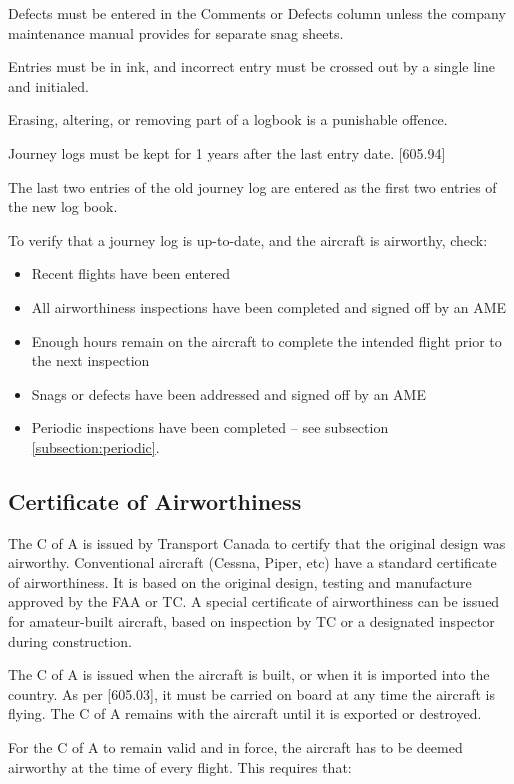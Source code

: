 \documentclass[12pt,letterpaper]{article}
\begin{document}
    Defects must be entered in the Comments or Defects column unless the company maintenance manual provides for separate snag sheets.
    
    Entries must be in ink, and incorrect entry must be crossed out by a single line and initialed.
    
    Erasing, altering, or removing part of a logbook is a punishable offence.
    
    Journey logs must be kept for 1 years after the last entry date. [605.94]
    
    The last two entries of the old journey log are entered as the first two entries of the new log book.
    
    To verify that a journey log is up-to-date, and the aircraft is airworthy, check:
    \begin{itemize}
        \item Recent flights have been entered
        \item All airworthiness inspections have been completed and signed off by an AME
        \item Enough hours remain on the aircraft to complete the intended flight prior to the next inspection
        \item Snags or defects have been addressed and signed off by an AME
        \item Periodic inspections have been completed -- see subsection \ref{subsection:periodic}.
    \end{itemize}
    
    \subsection{Certificate of Airworthiness}

    The C of A is issued by Transport Canada to certify that the original design was airworthy.  Conventional aircraft (Cessna, Piper, etc) have a standard certificate of airworthiness. It is based on the original design, testing and manufacture approved by the FAA or TC. A special certificate of airworthiness can be issued for amateur-built aircraft, based on inspection by TC or a designated inspector during construction.  

    The C of A is issued when the aircraft is built, or when it is imported into the country. As per [605.03], it must be carried on board at any time the aircraft is flying. The C of A remains with the aircraft until it is exported or destroyed.

    For the C of A to remain valid and in force, the aircraft has to be deemed airworthy at the time of every flight.  This requires that:
\end{document}
